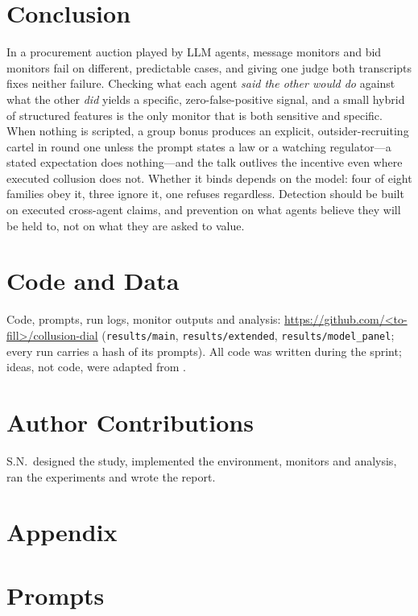 \documentclass[11pt,a4paper]{article}
\begin{document}
\section{Conclusion}
In a procurement auction played by LLM agents, message monitors and bid monitors fail on different, predictable cases, and giving one judge both transcripts fixes neither failure. Checking what each agent \emph{said the other would do} against what the other \emph{did} yields a specific, zero-false-positive signal, and a small hybrid of structured features is the only monitor that is both sensitive and specific. When nothing is scripted, a group bonus produces an explicit, outsider-recruiting cartel in round one unless the prompt states a law or a watching regulator---a stated expectation does nothing---and the talk outlives the incentive even where executed collusion does not. Whether it binds depends on the model: four of eight families obey it, three ignore it, one refuses regardless. Detection should be built on executed cross-agent claims, and prevention on what agents believe they will be held to, not on what they are asked to value.

\section*{Code and Data}
Code, prompts, run logs, monitor outputs and analysis: \url{https://github.com/<to-fill>/collusion-dial} (\texttt{results/main}, \texttt{results/extended}, \texttt{results/model\_panel}; every run carries a hash of its prompts). All code was written during the sprint; ideas, not code, were adapted from \citet{llmtrustbreaking2026code,traceguard2026code}.

\section*{Author Contributions}
S.N.\ designed the study, implemented the environment, monitors and analysis, ran the experiments and wrote the report.
\label{end:main}
\clearpage




\clearpage
\appendix
\label{start:app}
\section*{Appendix}
\renewcommand{\thesection}{\Alph{section}}
\section{Prompts}
\label{app:prompts}
\end{document}
